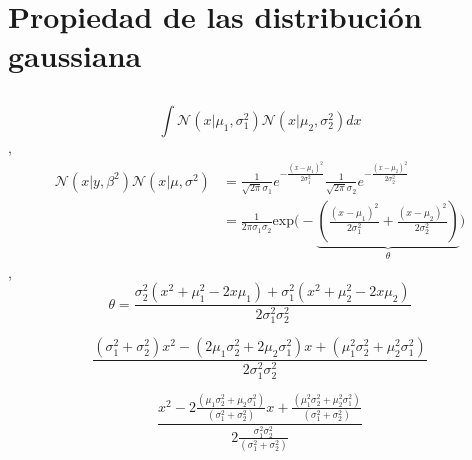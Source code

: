 \documentclass[a4paper,11pt]{book}
\newcommand{\N}{\mathcal{N}}
\theoremstyle{definition}
\newif\ifen
\newif\ifes
\newcommand{\en}[1]{\ifen#1\fi}
\newcommand{\es}[1]{\ifes#1\fi}
\begin{document}
\section{Propiedad de las distribución gaussiana} \label{sec:propiedades_de_la_gaussiana}

\subsection{\en{Gaussian product}}\label{multiplicacion_normales}

\en{The problem we must solve is}
\es{El problema que tenemos que resolver es}
\begin{equation}
 \int \N(x|\mu_1,\sigma_1^2)\N(x|\mu_2,\sigma_2^2) dx
\end{equation}
%
\en{By definition},
\begin{equation}
\begin{split}
 \N(x|y,\beta^2)\N(x|\mu,\sigma^2) & = \frac{1}{\sqrt{2\pi}\sigma_1}e^{-\frac{(x-\mu_1)^2}{2\sigma_1^2}} \frac{1}{\sqrt{2\pi}\sigma_2}e^{-\frac{(x-\mu_2)^2}{2\sigma_2^2}}  \\
 & = \frac{1}{2\pi\sigma_1\sigma_2}\text{exp}\Bigg(-\underbrace{\left( \frac{(x-\mu_1)^2}{2\sigma_1^2} + \frac{(x-\mu_2)^2}{2\sigma_2^2} \right)}_{\theta} \Bigg)
\end{split}
\end{equation}
%
\en{Then},
\begin{equation}
 \theta = \frac{\sigma_2^2(x^2 + \mu_1^2 - 2x\mu_1) + \sigma_1^2(x^2 + \mu_2^2 - 2x\mu_2) }{2\sigma_1^2\sigma_2^2}
\end{equation}
%
\en{We expand and reorder the factors by powers of $x$}
\es{Expando y reordeno los factores por potencias de $x$}
\begin{equation}
 \frac{(\sigma_1^2 + \sigma_2^2) x^2 - (2\mu_1\sigma_2^2 + 2\mu_2\sigma_1^2) x + (\mu_1^2\sigma_2^2 + \mu_2^2\sigma_1^2)}{2\sigma_1^2\sigma_2^2}
\end{equation}
%
\en{We divide the numerator and denominator by the factor of $x^2$}
\es{Divido al numerador y el denominador por el factor de $x^2$}
\begin{equation}
 \frac{x^2 - 2\frac{(\mu_1\sigma_2^2 + \mu_2\sigma_1^2)}{(\sigma_1^2 + \sigma_2^2) } x + \frac{(\mu_1^2\sigma_2^2 + \mu_2^2\sigma_1^2)}{(\sigma_1^2 + \sigma_2^2) }}{2\frac{\sigma_1^2\sigma_2^2}{(\sigma_1^2 + \sigma_2^2)}}
\end{equation}
%
\en{This equation is quadratic in x, and is therefore proportional to a Gaussian density function with standar deviation}
\end{document}
